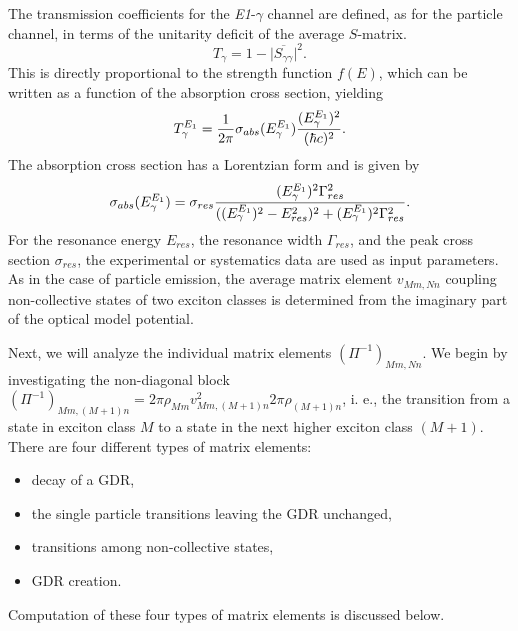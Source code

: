 The transmission coefficients for the \emph{E1}-$\gamma$ channel are
defined, as for the particle channel, in terms of the unitarity deficit of
the average $S$-matrix.
\begin{equation}
T_{\gamma}=1-\Big|\overline{S_{\gamma\gamma}}\Big|^{2}.
\end{equation}
This is directly proportional to the strength function $f(E)$, which can be
written as a function of the absorption cross section, yielding
\begin{equation}
T_{\gamma}^{E_{1}}=\frac{1}{2\pi}\sigma_{abs}(E_{\gamma}^{E_{1}})\frac{%
(E_{\gamma}^{E_{1}})^{2}}{(\hbar c)^{2}}.
\end{equation}
The absorption cross section has a Lorentzian form and is given by
\begin{equation}
\sigma_{abs}(E_{\gamma}^{E_{1}})=\sigma_{res}\frac{(E_{\gamma}^{E_{1}})^{2}%
\Gamma_{res}^{2}}{((E_{\gamma}^{E_{1}})^{2}-E_{res}^{2})^{2}+(E_{%
\gamma}^{E_{1}})^{2}\Gamma_{res}^{2}}.
\end{equation}
For the resonance energy $E_{res}$, the resonance width $\Gamma_{res}$, and
the peak cross section $\sigma_{res}$, the experimental or systematics data
are used as input parameters. As in the case of particle emission, the
average matrix element $v_{Mm,Nn}$ coupling non-collective states of two
exciton classes is determined from the imaginary part of the optical model
potential.

Next, we will analyze the individual matrix elements $(\Pi^{-1})_{Mm,Nn}$.
We begin by investigating the non-diagonal block $(\Pi^{-1})_{Mm,(M+1)n}=2%
\pi\rho_{Mm}v_{Mm,(M+1)n}^{2}2\pi\rho_{(M+1)n}$, i. e., the transition from
a state in exciton class $M$ to a state in the next higher exciton class $%
(M+1)$. There are four different types of matrix elements:

\begin{itemize}
\item decay of a GDR,

\item the single particle transitions leaving the GDR unchanged,

\item transitions among non-collective states,

\item GDR creation.
\end{itemize}

Computation of these four types of matrix elements is discussed below.

